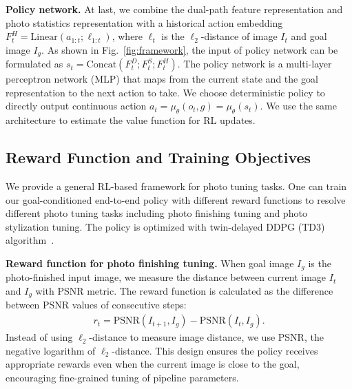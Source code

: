 \documentclass{article}
\newcommand{\taskPFT}{photo finishing tuning\xspace}
\newcommand{\taskPST}{photo stylization tuning\xspace}
\begin{document}
\noindent\textbf{Policy network.} 
At last, we combine the dual-path feature representation and photo statistics representation with a historical action embedding $F^H_t = \text{Linear}(a_{1:t}; \ell_{1:t})$, where $\ell_t$ is the $\ell_2$-distance of image $I_t$ and goal image $I_g$. As shown in Fig.~\ref{fig:framework}, the input of policy network can be formulated as $s_t = \text{Concat}(F^D_t; F^S_t; F^H_t)$. The policy network is a multi-layer perceptron network (MLP) that maps from the current state and the goal representation to the next action to take. We choose deterministic policy to directly output continuous action $a_t = \mu_\theta (o_t, g) = \mu_\theta (s_t)$. We use the same architecture to estimate the value function for RL updates.

\vspace{-10pt}
\subsection{Reward Function and Training Objectives}
\label{sec:3.4}
\vspace{-2pt}
We provide a general RL-based framework for photo tuning tasks. One can train our goal-conditioned end-to-end policy with different reward functions to resolve different photo tuning tasks including \taskPFT and \taskPST. The policy is optimized with twin-delayed DDPG (TD3) algorithm~\cite{fujimoto2018addressing-td3}.

\noindent\textbf{Reward function for \taskPFT.} 
When goal image $I_g$ is the photo-finished input image, we measure the distance between current image $I_t$ and $I_g$ with PSNR metric. The reward function is calculated as the difference between PSNR values of consecutive steps:
\begin{align}\label{eq:rew_pft}
r_t = \text{PSNR}(I_{t+1}, I_g) - \text{PSNR}(I_{t}, I_g).
\end{align}
Instead of using $\ell_2$-distance to measure image distance, we use PSNR, the negative logarithm of $\ell_2$-distance. This design ensures the policy receives appropriate rewards even when the current image is close to the goal, encouraging fine-grained tuning of pipeline parameters.
\end{document}
